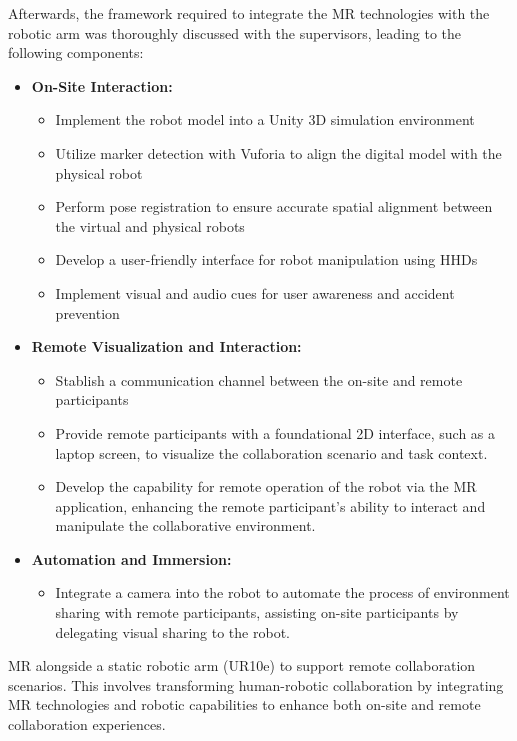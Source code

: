 Afterwards, the framework required to integrate the \ac{MR} technologies with the robotic arm was thoroughly discussed with the supervisors, leading to the following components:
\begin{itemize}
    \item \textbf{On-Site Interaction:}
    \begin{itemize}
        \item Implement the robot model into a Unity 3D simulation environment
        \item Utilize marker detection with Vuforia to align the digital model with the physical robot
        \item Perform pose registration to ensure accurate spatial alignment between the virtual and physical robots
        \item Develop a user-friendly interface for robot manipulation using \ac{HHDs}
        \item Implement visual and audio cues for user awareness and accident prevention 
    \end{itemize}
    \item \textbf{Remote Visualization and Interaction:}
    \begin{itemize}
        \item Stablish a communication channel between the on-site and remote participants
        
        \item Provide remote participants with a foundational 2D interface, such as a laptop screen, to visualize the collaboration scenario and 
        task context.
        \item Develop the capability for remote operation of the robot via the \ac{MR} application, enhancing the remote participant's ability to 
        interact and manipulate the collaborative environment.
    \end{itemize}
    \item \textbf{Automation and Immersion:}
    \begin{itemize}
        \item Integrate a camera into the robot to automate the process of environment sharing with remote participants, assisting on-site participants 
        by delegating visual sharing to the robot.
    \end{itemize}
\end{itemize}



\ac{MR} alongside a static robotic arm (UR10e) to support remote collaboration scenarios. This involves transforming human-robotic collaboration by integrating \ac{MR} technologies and robotic capabilities to enhance both on-site and remote collaboration experiences.

